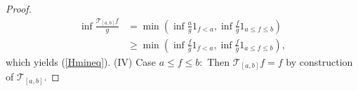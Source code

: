 \documentclass[10pt,a4paper]{amsart}
\begin{document}
\begin{proof}
\begin{align*}
\inf\frac{\mathcal{T}_{\left[  a,b\right]  }f}{g} &  =\min\left(  \inf\frac
{a}{g}1_{f<a},\inf\frac{f}{g}1_{a\leq f\leq b}\right)  \\
&  \geq\min\left(  \inf\frac{f}{g}1_{f<a},\inf\frac{f}{g}1_{a\leq f\leq
b}\right)  ,
\end{align*}
which yields (\ref{Hmineq}). (IV) Case $a\leq f\leq b:$ Then $\mathcal{T}%
_{\left[  a,b\right]  }f=f$ by construction of $\mathcal{T}_{\left[
a,b\right]  }.$
%
\end{proof}
\end{document}
